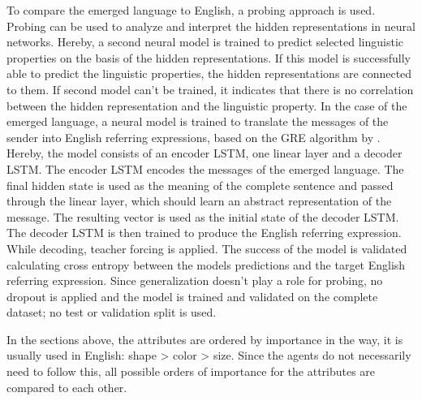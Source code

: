 To compare the emerged language to English, a probing approach is used.
Probing can be used to analyze and interpret the hidden representations in neural networks.
Hereby, a second neural model is trained to predict selected linguistic properties on the basis of the hidden representations.
If this model is successfully able to predict the linguistic properties, the hidden representations are connected to them.
If second model can't be trained, it indicates that there is no correlation between the hidden representation and the linguistic property.
In the case of the emerged language, a neural model is trained to translate the messages of the sender into English referring expressions, based on the GRE algorithm by \cite{Dale1995}.
Hereby, the model consists of an encoder LSTM, one linear layer and a decoder LSTM.
The encoder LSTM encodes the messages of the emerged language.
The final hidden state is used as the meaning of the complete sentence and passed through the linear layer, which should learn an abstract representation of the message.
The resulting vector is used as the initial state of the decoder LSTM.
The decoder LSTM is then trained to produce the English referring expression.
While decoding, teacher forcing is applied.
The success of the model is validated calculating cross entropy between the models predictions and the target English referring expression.
Since generalization doesn't play a role for probing, no dropout is applied and the model is trained and validated on the complete dataset; no test or validation split is used.

In the sections above, the attributes are ordered by importance in the way, it is usually used in English: shape > color > size.
Since the agents do not necessarily need to follow this, all possible orders of importance for the attributes are compared to each other.

